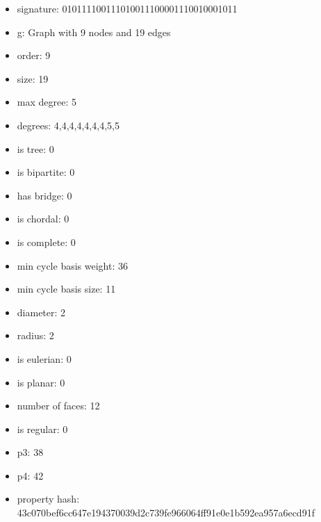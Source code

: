 \newpage
\begin{figure}
\end{figure}
\begin{itemize}
\item signature: 010111100111010011100001110010001011
\item g: Graph with 9 nodes and 19 edges
\item order: 9
\item size: 19
\item max degree: 5
\item degrees: 4,4,4,4,4,4,4,5,5
\item is tree: 0
\item is bipartite: 0
\item has bridge: 0
\item is chordal: 0
\item is complete: 0
\item min cycle basis weight: 36
\item min cycle basis size: 11
\item diameter: 2
\item radius: 2
\item is eulerian: 0
\item is planar: 0
\item number of faces: 12
\item is regular: 0
\item p3: 38
\item p4: 42
\item property hash: 43c070bef6cc647e194370039d2c739fe966064ff91e0e1b592ea957a6ecd91f
\end{itemize}
